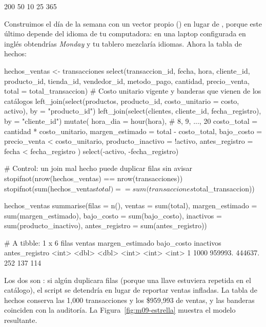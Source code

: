 \begin{rsalida}
[1] 200  50  10  25 365
\end{rsalida}

Construimos el día de la semana con un vector propio () en
lugar de , porque este último depende del idioma
de tu computadora: en una laptop configurada en inglés obtendrías
\emph{Monday} y tu tablero mezclaría idiomas. Ahora la tabla de hechos:

\begin{rcode}
hechos_ventas <- transacciones %
  select(transaccion_id, fecha, hora, cliente_id, producto_id,
         tienda_id, vendedor_id, metodo_pago, cantidad, precio_venta,
         total = total_transaccion) %
  # Costo unitario vigente y banderas que vienen de los catálogos
  left_join(select(productos, producto_id, costo_unitario = costo,
                   activo), by = "producto_id") %
  left_join(select(clientes, cliente_id, fecha_registro),
            by = "cliente_id") %
  mutate(
    hora_dia          = hour(hora),                 # 8, 9, ..., 20
    costo_total       = cantidad * costo_unitario,
    margen_estimado   = total - costo_total,
    bajo_costo        = precio_venta < costo_unitario,
    producto_inactivo = !activo,
    antes_registro    = fecha < fecha_registro
  ) %
  select(-activo, -fecha_registro)

# Control: un join mal hecho puede duplicar filas sin avisar
stopifnot(nrow(hechos_ventas) == nrow(transacciones))
stopifnot(sum(hechos_ventas$total) == sum(transacciones$total_transaccion))

hechos_ventas %
  summarise(filas = n(), ventas = sum(total),
            margen_estimado = sum(margen_estimado),
            bajo_costo = sum(bajo_costo),
            inactivos = sum(producto_inactivo),
            antes_registro = sum(antes_registro))
\end{rcode}

\begin{rsalida}
# A tibble: 1 x 6
  filas  ventas margen_estimado bajo_costo inactivos antes_registro
  <int>   <dbl>           <dbl>      <int>     <int>          <int>
1  1000 959993.         444637.        252       137            114
\end{rsalida}

Los dos  son : si
algún  duplicara filas (porque una llave estuviera
repetida en el catálogo), el script se detendría en lugar de reportar ventas
infladas. La tabla de hechos conserva las 1,000 transacciones y los
\$959,993 de ventas, y las banderas coinciden con la auditoría. La
Figura~\ref{fig:m09-estrella} muestra el modelo resultante.

